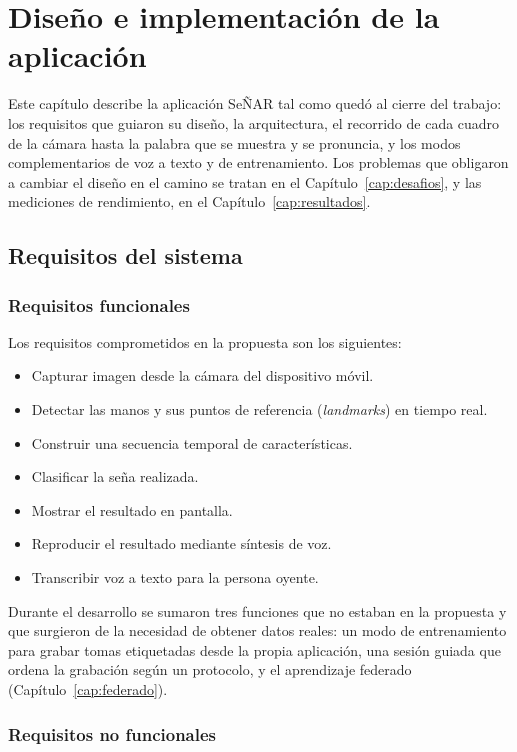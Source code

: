 \chapter{Diseño e implementación de la aplicación}
\label{cap:diseno}

Este capítulo describe la aplicación SeÑAR tal como quedó al cierre del trabajo: los requisitos que guiaron su diseño, la arquitectura, el recorrido de cada cuadro de la cámara hasta la palabra que se muestra y se pronuncia, y los modos complementarios de voz a texto y de entrenamiento. Los problemas que obligaron a cambiar el diseño en el camino se tratan en el Capítulo~\ref{cap:desafios}, y las mediciones de rendimiento, en el Capítulo~\ref{cap:resultados}.

\section{Requisitos del sistema}

\subsection{Requisitos funcionales}

Los requisitos comprometidos en la propuesta son los siguientes:

\begin{itemize}
    \item Capturar imagen desde la cámara del dispositivo móvil.
    \item Detectar las manos y sus puntos de referencia (\emph{landmarks}) en tiempo real.
    \item Construir una secuencia temporal de características.
    \item Clasificar la seña realizada.
    \item Mostrar el resultado en pantalla.
    \item Reproducir el resultado mediante síntesis de voz.
    \item Transcribir voz a texto para la persona oyente.
\end{itemize}

Durante el desarrollo se sumaron tres funciones que no estaban en la propuesta y que surgieron de la necesidad de obtener datos reales: un modo de entrenamiento para grabar tomas etiquetadas desde la propia aplicación, una sesión guiada que ordena la grabación según un protocolo, y el aprendizaje federado (Capítulo~\ref{cap:federado}).

\subsection{Requisitos no funcionales}


